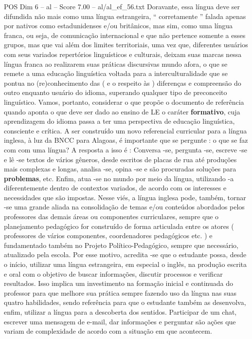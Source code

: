 \begin{textsample}{POS Dim 6 – al – Score 7.00 – al/al\_ef\_56.txt}
Doravante, essa língua deve ser difundida não mais como uma língua estrangeira, “ corretamente ” falada apenas por nativos como estadunidenses e/ou britânicos, mas sim, como uma língua franca, ou seja, de comunicação internacional e que não pertence somente a esses grupos, mas que vai além dos limites territoriais, uma vez que, diferentes usuários com seus variados repertórios linguísticos e culturais, deixam suas marcas nessa língua franca ao realizarem suas práticas discursivas mundo afora, o que se remete a uma educação linguística voltada para a interculturalidade que se pontua no (re)conhecimento das ( e o respeito às ) diferenças e compreensão do outro enquanto usuário do idioma, superando qualquer tipo de preconceito linguístico.
Vamos, portanto, considerar o que propõe o documento de referência quando aponta o que deve ser dado ao ensino de LE o caráter \textbf{formativo}, cuja aprendizagem do idioma passa a ter uma perspectiva de educação linguística, consciente e crítica.
A ser construído um novo referencial curricular para a língua inglesa, à luz da BNCC para Alagoas, é importante que se pergunte : o que se faz com com uma língua?
A resposta a isso é : Conversa -se, pergunta -se, escreve -se e lê -se textos de vários gêneros, desde escritos de placas de rua até produções mais complexas e longas, analisa -se, opina -se e são procuradas soluções para \textbf{problemas}, etc.
Enfim, atua -se no mundo por meio da língua, utilizando -a diferentemente dentro de contextos variados, de acordo com os interesses e necessidades que são impostas.
Nesse viés, a língua inglesa pode, também, tornar -se uma grande aliada na consolidação de temas e/ou conteúdos abordados pelos professores das demais áreas ou componentes curriculares, sempre que o planejamento pedagógico for construído de forma articulada entre os atores ( professores de vários componentes, coordenadores pedagógicos etc. ) e fundamentado também no Projeto Político-Pedagógico, sempre que necessário, atualizado pela escola.
Por esse motivo, acredita -se que o estudante possa, desde o início, utilizar uma língua estrangeira, em especial o inglês, na produção escrita e oral com o objetivo de buscar informações, discutir processos e verificar resultados.
Isso implica um investimento na formação inicial e continuada do professor para que melhore sua prática sempre fazendo uso da língua nas suas quatro habilidades, sendo referência para que o estudante também as desenvolva, enfim, utilizar a língua para a descoberta dos sentidos.
Participar de um chat, escrever uma mensagem de e-mail, dar informações e perguntar são ações que variam de complexidade de acordo com a situação em que acontecem.

\end{textsample}
